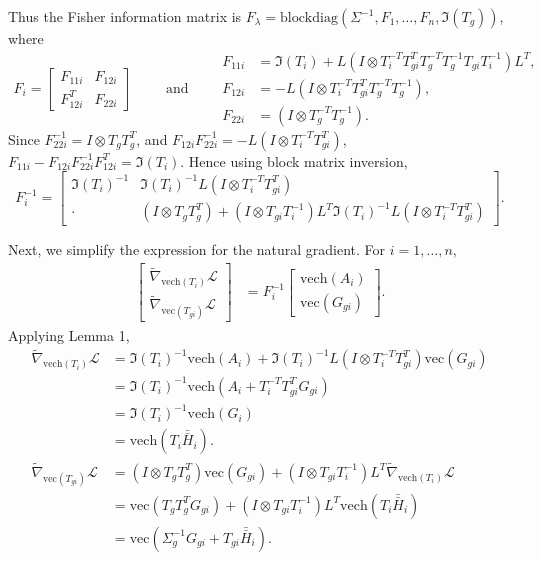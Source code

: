 \documentclass{statsoc}
\newcommand\blockdiag{{\text{blockdiag}}}
\newcommand\mL{{\mathcal{L}}}
\newcommand{\vc}{\text{vec}}
\newcommand{\vech}{\text{vech}}
\newcommand{\dH}{\bar{\bar{H}}}
\begin{document}
Thus the Fisher information matrix is $F_\lambda = \blockdiag(\Sigma^{-1}, F_1, \dots, F_n, \mathfrak{I}(T_g) )$, where 
\begin{equation*}
\begin{aligned}
F_i = \begin{bmatrix}
F_{11i} & F_{12i} \\
F_{12i}^T & F_{22i}
\end{bmatrix}
\end{aligned}
\qquad  \text{and} \qquad
\begin{aligned}
F_{11i} &= \mathfrak{I}(T_i) +  L ( I \otimes T_i^{-T} T_{gi}^T T_g^{-T} T_g^{-1} T_{gi} T_i^{-1} ) L^T, \\
F_{12i} &= - L (I \otimes T_i^{-T} T_{gi}^T T_g^{-T} T_g^{-1}) , \\
F_{22i} &= (I \otimes T_g^{-T}T_g^{-1}). 
\end{aligned}
\end{equation*}
Since $F_{22i}^{-1} = I \otimes T_gT_g^T$, and $F_{12i}F_{22i}^{-1} = - L (I \otimes T_i^{-T} T_{gi}^T)$, $F_{11i} - F_{12i} F_{22i}^{-1} F_{12i}^T = \mathfrak{I}(T_i)$. Hence using block matrix inversion,
\[
F_i^{-1} = \begin{bmatrix}
\mathfrak{I}(T_i)^{-1} & \mathfrak{I}(T_i)^{-1} L (I \otimes T_i^{-T} T_{gi}^T)  \\
\cdot &  (I \otimes T_g T_g^T) +  (I \otimes T_{gi} T_i^{-1}) L^T \mathfrak{I}(T_i)^{-1} L (I \otimes T_i^{-T} T_{gi}^T)
\end{bmatrix}.
\]

Next, we simplify the expression for the natural gradient. For $i=1, \dots, n$,
\[
\begin{aligned}
\begin{bmatrix}
\widetilde{\nabla}_{\vech(T_i)} \mL \\ \widetilde{\nabla}_{\vc(T_{gi})} \mL
\end{bmatrix} 
&= F_i^{-1} \begin{bmatrix}  \vech(A_i)  \\  \vc(G_{gi})  \end{bmatrix}.
\end{aligned}
\]
Applying Lemma 1, 
\begin{align*}
\widetilde{\nabla}_{\vech(T_i)} \mL &= \mathfrak{I}(T_i)^{-1}  \vech(A_i) +  \mathfrak{I}(T_i)^{-1}  L (I \otimes T_i^{-T} T_{gi}^T) \vc(G_{gi}) \\
&= \mathfrak{I}(T_i)^{-1} \vech(A_i + T_i^{-T} T_{gi}^T G_{gi})  \\
&= \mathfrak{I}(T_i)^{-1} \vech(G_i )  \\
&= \vech(T_i \dH_i). \\
\widetilde{\nabla}_{\vc(T_{gi})} \mL 
&= (I \otimes T_gT_g^T)  \vc(G_{gi})+  (I \otimes T_{gi} T_i^{-1}) L^T \widetilde{\nabla}_{\vech(T_i)} \mL \\
&= \vc(T_gT_g^T G_{gi}) +  (I \otimes T_{gi} T_i^{-1}) L^T \vech (T_i \dH_i) \\
&= \vc(\Sigma_g^{-1} G_{gi} + T_{gi}\dH_i).
\end{align*}
\end{document}
